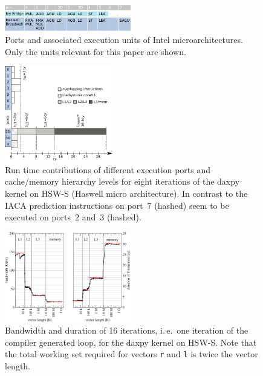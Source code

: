 {\begin{figure}[tp]
  \centering
  \includegraphics[width=0.49\textwidth,clip=true]{images/IntelMicroArchPorts}
  \caption{Ports and associated execution units of Intel microarchitectures.
Only the units relevant for this paper are shown.}
  \label{fig:ports}
\end{figure}

\begin{figure}[tp]
  \centering
  \includegraphics[width=0.42\textwidth,clip=true]{images/ecm-hsw-daxpy}
  \caption{Run time contributions of different execution ports and cache/memory
hierarchy levels for eight iterations of the daxpy kernel on HSW-S (Haswell micro
architecture). In contrast to the IACA prediction instructions on port~$7$
(hashed) seem to be executed on ports~$2$ and~$3$ (hashed).}
  \label{fig:daxpy:ecm}
\end{figure}

\begin{figure}[tp]
  \centering
  \includegraphics[width=0.49\textwidth,clip=true]{images/daxpy-bw-hasep1-f-2.3-w-cy}
  \caption{Bandwidth and duration of 16 iterations, i.\,e.\ one iteration of the
compiler generated loop, for the daxpy kernel on HSW-S. Note that the total
working set required for vectors
\protect\texttt{r} and \texttt{l} is twice the vector length.}
  \label{fig:daxpy:perf}
\end{figure}

}
